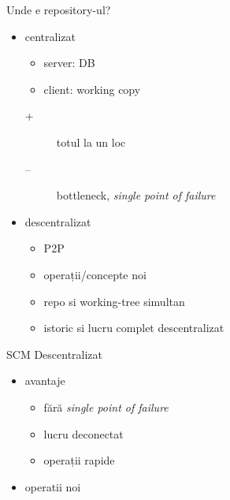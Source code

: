 \documentclass{beamer}
\begin{document}
\begin{frame}{Unde e repository-ul?}
  \begin{itemize}
    \item centralizat
      \begin{itemize}
        \item server: DB
        \item client: working copy
      \end{itemize}
      \pause
      \begin{description}
        \item[+] totul la un loc
        \item[--] bottleneck, \textit{single point of failure}
      \end{description}
    \pause
    \item descentralizat
      \begin{itemize}
        \item P2P
        \item operații/concepte noi
        \item repo si working-tree simultan
        \item istoric si lucru complet descentralizat
      \end{itemize}
  \end{itemize}
\end{frame}

\begin{frame}{SCM Descentralizat}
  \begin{itemize}
    \item avantaje
      \begin{itemize}
        \item fără \textit{single point of failure}
        \item lucru deconectat
        \item operații rapide
      \end{itemize}
      \pause
    \item operatii noi
  \end{itemize}
\end{frame}
\end{document}
